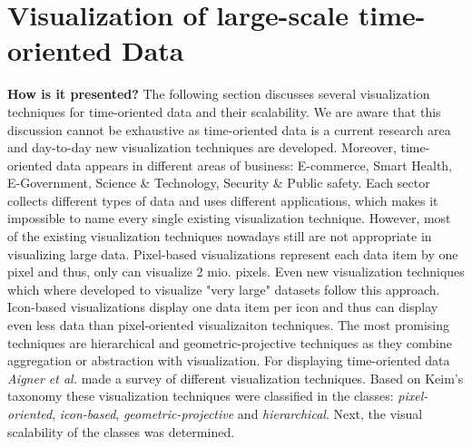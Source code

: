 \section{Visualization of large-scale time-oriented Data}
\textbf{How is it presented?}
The following section discusses several visualization techniques for time-oriented data and their scalability. We are aware that this discussion cannot be exhaustive as time-oriented data is a current research area and day-to-day new visualization techniques are developed.
Moreover, time-oriented data appears in different areas of business: E-commerce, Smart Health, E-Government, Science \& Technology, Security \& Public safety. Each sector collects different types of data and uses different applications, which makes it impossible to name every single existing visualization technique.
However, most of the existing visualization techniques nowadays still are not appropriate in visualizing large data. Pixel-based visualizations represent each data item by one pixel and thus, only can visualize 2 mio. pixels. Even new visualization techniques which where developed to visualize "very large" datasets follow this approach\cite{Keim1995, Keim1996}. Icon-based visualizations display one data item per icon and thus can display even less data than pixel-oriented visualizaiton techniques. The most promising techniques are hierarchical and geometric-projective techniques as they combine aggregation or abstraction with visualization. 
For displaying time-oriented data \textit{Aigner et al.} made a survey of different visualization techniques. Based on Keim's taxonomy\cite{Keim1995} these visualization techniques were classified in the classes: \textit{pixel-oriented}, \textit{icon-based}, \textit{geometric-projective} and \textit{hierarchical}. Next, the visual scalability of the classes was determined. 

